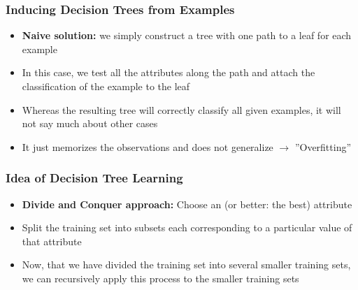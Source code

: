 \documentclass[conference]{styles/acmsiggraph}
\begin{document}
\newpage

        \subsubsection{Inducing Decision Trees from Examples}
            \begin{itemize}
                \item \textbf{Naive solution:} we simply construct a tree with one path to a leaf for each example
                \item In this case, we test all the attributes along the path and attach the classification of the example to the leaf
                \item Whereas the resulting tree will correctly classify all given examples, it will not say much about other cases
                \item It just memorizes the observations and does not generalize\newline
                $\rightarrow$ ''Overfitting''
            \end{itemize}
        
        \subsubsection{Idea of Decision Tree Learning}
            \begin{itemize}
                \item \textbf{Divide and Conquer approach:} Choose an (or better: the best) attribute
                \item Split the training set into subsets each corresponding to a particular value of that attribute
                \item Now, that we have divided the training set into several smaller training sets, we can recursively apply this process to the smaller training sets
            \end{itemize}
        
\end{document}
